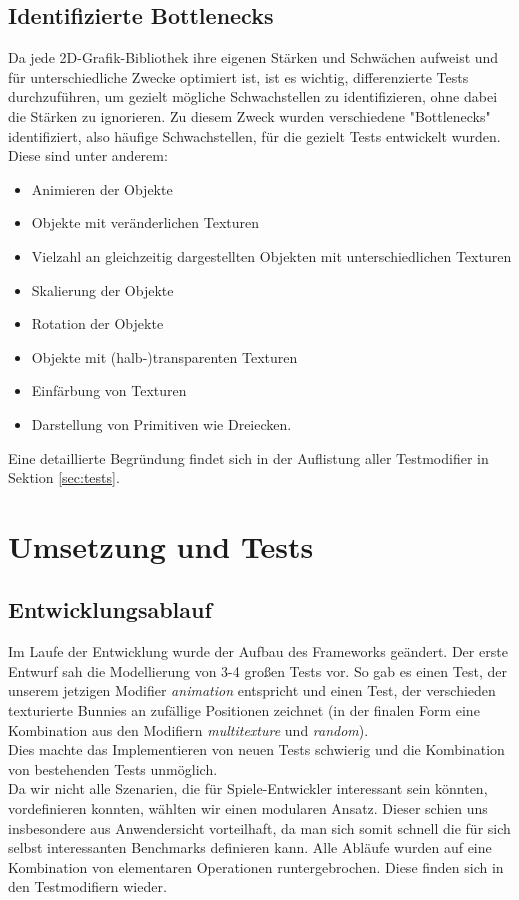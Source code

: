 \section{Identifizierte Bottlenecks}
\label{sec:bottlenecks}
Da jede 2D-Grafik-Bibliothek ihre eigenen Stärken und Schwächen aufweist und für unterschiedliche Zwecke optimiert ist, ist es wichtig, differenzierte Tests durchzuführen, um gezielt mögliche Schwachstellen zu identifizieren, ohne dabei die Stärken zu ignorieren. Zu diesem Zweck wurden verschiedene "Bottlenecks" identifiziert, also häufige Schwachstellen, für die gezielt Tests entwickelt wurden. Diese sind unter anderem:\\
\begin{itemize}
\item Animieren der Objekte
\item Objekte mit veränderlichen Texturen
\item Vielzahl an gleichzeitig dargestellten Objekten mit unterschiedlichen Texturen
\item Skalierung der Objekte
\item Rotation der Objekte
\item Objekte mit (halb-)transparenten Texturen
\item Einfärbung von Texturen
\item Darstellung von Primitiven wie Dreiecken.
\end{itemize}

Eine detaillierte Begründung findet sich in der Auflistung aller Testmodifier in Sektion \ref{sec:tests}.

\chapter{Umsetzung und Tests}
\label{ch:umsetzung}
\section{Entwicklungsablauf}
Im Laufe der Entwicklung wurde der Aufbau des Frameworks geändert. Der erste Entwurf sah die Modellierung von 3-4 großen Tests vor. So gab es einen Test, der unserem jetzigen Modifier \emph{animation} entspricht und einen Test, der verschieden texturierte Bunnies an zufällige Positionen zeichnet (in der finalen Form eine Kombination aus den Modifiern \emph{multitexture} und \emph{random}). \\
Dies machte das Implementieren von neuen Tests schwierig und die Kombination von bestehenden Tests unmöglich.\\
Da wir nicht alle Szenarien, die für Spiele-Entwickler interessant sein könnten, vordefinieren konnten, wählten wir einen modularen Ansatz. Dieser schien uns insbesondere aus Anwendersicht vorteilhaft, da man sich somit schnell die für sich selbst interessanten Benchmarks definieren kann. Alle Abläufe wurden auf eine Kombination von elementaren Operationen runtergebrochen. Diese finden sich in den Testmodifiern wieder.\\


